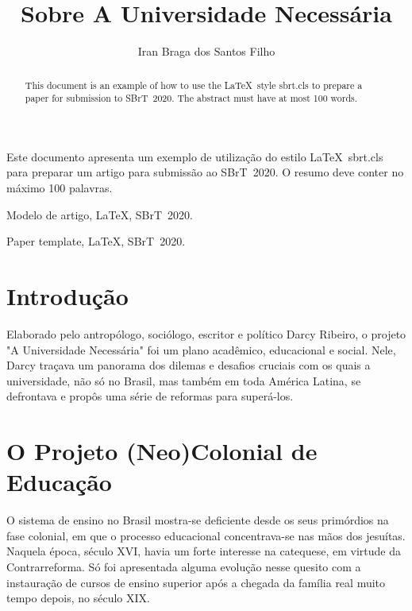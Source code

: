 \documentclass{sbrt}
\begin{document}
\title{Sobre A Universidade Necessária}

\author{Iran Braga dos Santos Filho}

\maketitle

\begin{resumo}
Este documento apresenta um exemplo de utilização do estilo \LaTeX\ sbrt.cls para preparar um artigo para submissão ao SBrT~2020. O resumo deve conter no máximo 100 palavras.
\end{resumo}
\begin{chave}
Modelo de artigo, \LaTeX, SBrT~2020.
\end{chave}

\begin{abstract}
This document is an example of how to use the \LaTeX\ style sbrt.cls to prepare a paper for submission to SBrT~2020. The abstract must have at most 100 words.
\end{abstract}
\begin{keywords}
Paper template, \LaTeX, SBrT~2020.
\end{keywords}

\section{Introdução}

Elaborado pelo antropólogo, sociólogo, escritor e político Darcy Ribeiro, o projeto "A Universidade Necessária"{} foi um plano acadêmico, educacional e social. Nele, Darcy traçava um panorama dos dilemas e desafios cruciais com os quais a universidade, não só no Brasil, mas também em toda América Latina, se defrontava e propôs uma série de reformas para superá-los.

\section{O Projeto (Neo)Colonial de Educação}

O sistema de ensino no Brasil mostra-se deficiente desde os seus primórdios na fase colonial, em que o processo educacional concentrava-se nas mãos dos jesuítas. Naquela época, século XVI, havia um forte interesse na catequese, em virtude da Contrarreforma. Só foi apresentada alguma evolução nesse quesito com a instauração de cursos de ensino superior após a chegada da família real muito tempo depois, no século XIX.
\end{document}

